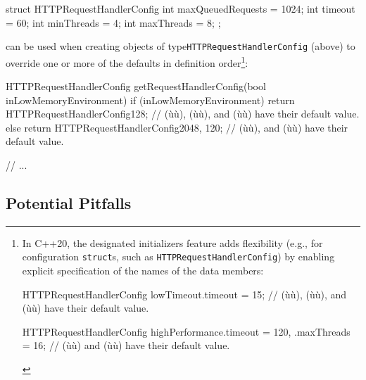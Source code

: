 \begin{emcppslisting}[emcppsbatch=e4,emcppsstandards={c++14}]
struct HTTPRequestHandlerConfig
{
    int maxQueuedRequests = 1024;
    int timeout           = 60;
    int minThreads        = 4;
    int maxThreads        = 8;
};
\end{emcppslisting}

\enlargethispage*{2ex}
\noindent {} can be used when creating objects of
type\linebreak[4]
\lstinline!HTTPRequestHandlerConfig! (above) to override one or more
of the defaults in definition order{\cprotect\footnote{In C++20, the
designated initializers feature adds flexibility (e.g., for
configuration \lstinline!struct!s, such as
\lstinline!HTTPRequestHandlerConfig!) by enabling explicit specification
of the names of the data members:

\begin{emcppslisting}[emcppsbatch=e4,style=footcode]
HTTPRequestHandlerConfig lowTimeout{.timeout = 15};
    // (ù{}ù), (ù{}ù), and (ù{}ù) have their default value.

HTTPRequestHandlerConfig highPerformance{.timeout = 120, .maxThreads = 16};
    // (ù{}ù) and (ù{}ù) have their default value.
\end{emcppslisting} 
\vspace*{-3ex} }}:

\begin{emcppslisting}[emcppsbatch=e4]
HTTPRequestHandlerConfig getRequestHandlerConfig(bool inLowMemoryEnvironment)
{
    if (inLowMemoryEnvironment)
    {
        return HTTPRequestHandlerConfig{128};
            // (ù{}ù), (ù{}ù), and (ù{}ù) have their default value.
    }
    else
    {
        return HTTPRequestHandlerConfig{2048, 120};
            // (ù{}ù), and (ù{}ù) have their default value.
    }
}

// ...
\end{emcppslisting}


\subsection[Potential Pitfalls]{Potential Pitfalls}\label{potential-pitfalls}


